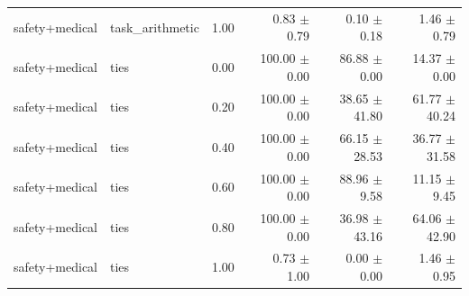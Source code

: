 \begin{table}[H]
{\begin{tabular}{lllrrr}
safety+medical & task\_arithmetic & 1.00 & 0.83 $\pm$ 0.79 & 0.10 $\pm$ 0.18 & 1.46 $\pm$ 0.79 \\
safety+medical & ties & 0.00 & 100.00 $\pm$ 0.00 & 86.88 $\pm$ 0.00 & 14.37 $\pm$ 0.00 \\
safety+medical & ties & 0.20 & 100.00 $\pm$ 0.00 & 38.65 $\pm$ 41.80 & 61.77 $\pm$ 40.24 \\
safety+medical & ties & 0.40 & 100.00 $\pm$ 0.00 & 66.15 $\pm$ 28.53 & 36.77 $\pm$ 31.58 \\
safety+medical & ties & 0.60 & 100.00 $\pm$ 0.00 & 88.96 $\pm$ 9.58 & 11.15 $\pm$ 9.45 \\
safety+medical & ties & 0.80 & 100.00 $\pm$ 0.00 & 36.98 $\pm$ 43.16 & 64.06 $\pm$ 42.90 \\
safety+medical & ties & 1.00 & 0.73 $\pm$ 1.00 & 0.00 $\pm$ 0.00 & 1.46 $\pm$ 0.95 \\
\bottomrule
\end{tabular}
}
\end{table}


\begin{table}[H]
\centering
\caption{予備実験 シード別詳細 - Method: mergealign, Pattern: safety+medical}
\label{tab:prelim_seeds_mergealign_safety_medical}
\small
{}
\end{table}


